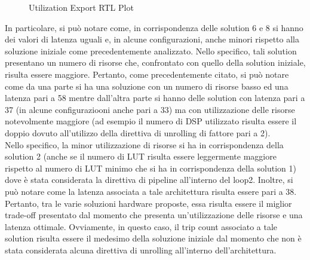 \begin{figure}[H]
	\centering
	\caption{Utilization Export RTL Plot}
	\label{fig:utilization-export-rtl-plot}
\end{figure}

In particolare, si può notare come, in corrispondenza delle solution 6 e 8 si hanno dei valori di latenza uguali e, in alcune configurazioni, anche minori rispetto alla soluzione iniziale come precedentemente analizzato. Nello specifico, tali solution presentano un numero di risorse che, confrontato con quello della solution iniziale, risulta essere maggiore. Pertanto, come precedentemente citato, si può notare come da una parte si ha una soluzione con un numero di risorse basso ed una latenza pari a 58 mentre dall'altra parte si hanno delle solution con latenza pari a 37 (in alcune configuraziooni anche pari a 33) ma con utilizzazione delle risorse notevolmente maggiore (ad esempio il numero di DSP utilizzato risulta essere il doppio dovuto all'utilizzo della direttiva di unrolling di fattore pari a 2).
\\
Nello specifico, la minor utilizzazione di risorse si ha in corrispondenza della solution 2 (anche se il numero di LUT risulta essere leggermente maggiore rispetto al numero di LUT minimo che si ha in corrispondenza della solution 1) dove è stata considerata la direttiva di pipeline all'interno del loop2. Inoltre, si può notare come la latenza associata a tale architettura risulta essere pari a 38. Pertanto, tra le varie soluzioni hardware proposte, essa risulta essere il miglior trade-off presentato dal momento che presenta un'utilizzazione delle risorse e una latenza ottimale. Ovviamente, in questo caso, il trip count associato a tale solution risulta essere il medesimo della soluzione iniziale dal momento che non è stata considerata alcuna direttiva di unrolling all'interno dell'architettura.